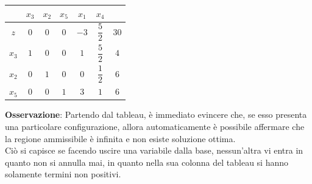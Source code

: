\documentclass[a4paper]{extarticle}
\renewcommand\arraystretch{}
\begin{document}
\begin{table}[H]
    \setlength{\tabcolsep}{4pt}
    \renewcommand{\arraystretch}{2.2}
    \noindent
    \centering
    \begin{tabular}{|c|ccc|cc|c|}
        & $x_3$ & $x_2$ & $x_5$ & $x_1$ & $x_4$ &\\
        \hline
        $z$ & $0$ & $0$ & $0$ & $-3$ & $\dfrac{5}{2}$ & $30$\\
        \hline
        $x_3$ & \cellcolor{red!50!white}$1$ & \cellcolor{red!50!white}$0$ & \cellcolor{red!50!white}$0$ & \cellcolor{blue!50!white}$1$ & \cellcolor{blue!50!white}$\dfrac{5}{2}$ & \cellcolor{orange!25!white}$4$\\
        $x_2$ & \cellcolor{red!50!white}$0$ & \cellcolor{red!50!white}$1$ & \cellcolor{red!50!white}$0$ & \cellcolor{blue!50!white}$0$ & \cellcolor{blue!50!white}$\dfrac{1}{2}$ & \cellcolor{orange!25!white}$6$\\
        $x_5$ & \cellcolor{red!50!white}$0$ & \cellcolor{red!50!white}$0$ & \cellcolor{red!50!white}$1$ & \cellcolor{blue!50!white}$3$ & \cellcolor{blue!50!white}$1$ & \cellcolor{orange!25!white}$6$\\
        \hline
    \end{tabular}
\end{table}

\vspace{1em}
\noindent
\textbf{Osservazione}: Partendo dal tableau, è immediato evincere che, se esso presenta una particolare configurazione, allora automaticamente è possibile affermare che la regione ammissibile è infinita e non esiste soluzione ottima.\\
Ciò si capisce se facendo uscire una variabile dalla base, nessun'altra vi entra in quanto non si annulla mai, in quanto nella sua colonna del tableau si hanno solamente termini non positivi.

\vspace{1em}
\end{document}
